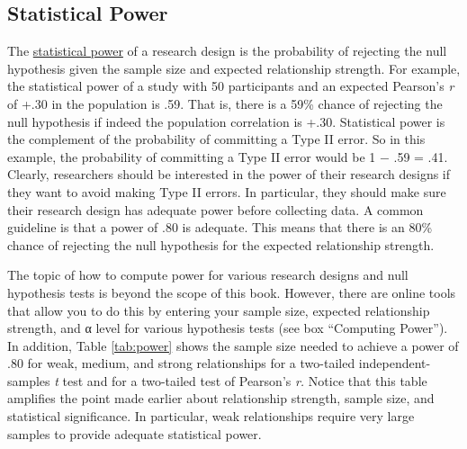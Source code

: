 \documentclass[
]{krantz}
\begin{document}
\subsection*{Statistical Power}\label{statistical-power}


The \hyperref[statistical-power]{statistical power} of a research design is the probability of rejecting the null hypothesis given the sample size and expected relationship strength. For example, the statistical power of a study with 50 participants and an expected Pearson's \emph{r} of +.30 in the population is .59. That is, there is a 59\% chance of rejecting the null hypothesis if indeed the population correlation is +.30. Statistical power is the complement of the probability of committing a Type II error. So in this example, the probability of committing a Type II error would be 1 − .59 = .41. Clearly, researchers should be interested in the power of their research designs if they want to avoid making Type II errors. In particular, they should make sure their research design has adequate power before collecting data. A common guideline is that a power of .80 is adequate. This means that there is an 80\% chance of rejecting the null hypothesis for the expected relationship strength.

The topic of how to compute power for various research designs and null hypothesis tests is beyond the scope of this book. However, there are online tools that allow you to do this by entering your sample size, expected relationship strength, and α level for various hypothesis tests (see box ``Computing Power''). In addition, Table \ref{tab:power} shows the sample size needed to achieve a power of .80 for weak, medium, and strong relationships for a two-tailed independent-samples \emph{t} test and for a two-tailed test of Pearson's \emph{r.} Notice that this table amplifies the point made earlier about relationship strength, sample size, and statistical significance. In particular, weak relationships require very large samples to provide adequate statistical power.
\end{document}
